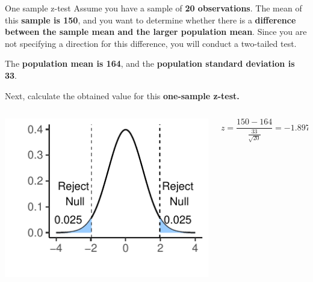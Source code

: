 \documentclass[
  ignorenonframetext,
]{beamer}
\begin{document}
\begin{frame}{One sample z-test}
\label{one-sample-z-test-1}
Assume you have a sample of \textbf{20 observations}. The mean of this
\textbf{sample is 150}, and you want to determine whether there is a
\textbf{difference between the sample mean and the larger population
mean}. Since you are not specifying a direction for this difference, you
will conduct a two-tailed test.

The \textbf{population mean is 164}, and the \textbf{population standard
deviation is 33}.

Next, calculate the obtained value for this \textbf{one-sample z-test.}

\begin{columns}[T]
\begin{column}{0.5\textwidth}
\includegraphics{Inferential-Stat-and-Z-test_files/figure-beamer/unnamed-chunk-8-1.pdf}
\end{column}

\begin{column}{0.5\textwidth}
\vspace{1cm}

\[
z = \frac{150 - 164}{\frac{33}{\sqrt{20}}} = -1.897
\]
\end{column}
\end{columns}
\end{frame}
\end{document}
